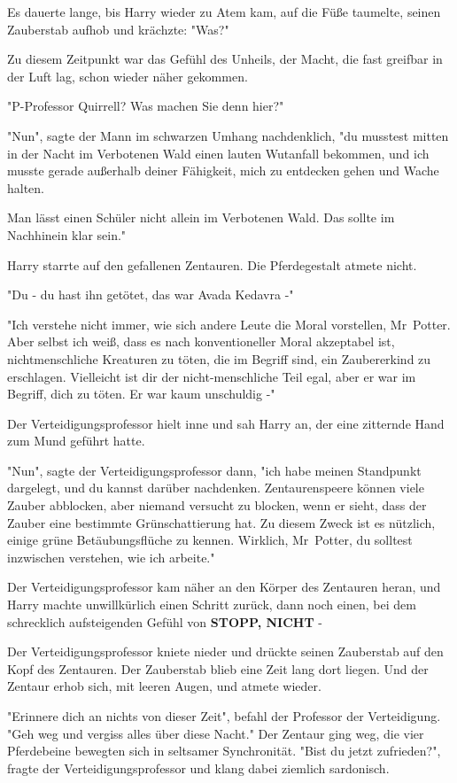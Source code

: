 {Es dauerte lange, bis Harry wieder zu Atem kam, auf die Füße taumelte, seinen Zauberstab aufhob und krächzte: "Was?"

Zu diesem Zeitpunkt war das Gefühl des Unheils, der Macht, die fast greifbar in der Luft lag, schon wieder näher gekommen.

"P-Professor Quirrell? Was machen Sie denn hier?"

"Nun", sagte der Mann im schwarzen Umhang nachdenklich, "du musstest mitten in der Nacht im Verbotenen Wald einen lauten Wutanfall bekommen, und ich musste gerade außerhalb deiner Fähigkeit, mich zu entdecken gehen und Wache halten.

Man lässt einen Schüler nicht allein im Verbotenen Wald. Das sollte im Nachhinein klar sein."

Harry starrte auf den gefallenen Zentauren. Die Pferdegestalt atmete nicht.

"Du - du hast ihn getötet, das war Avada Kedavra -"

"Ich verstehe nicht immer, wie sich andere Leute die Moral vorstellen, Mr~Potter. Aber selbst ich weiß, dass es nach konventioneller Moral akzeptabel ist, nichtmenschliche Kreaturen zu töten, die im Begriff sind, ein Zaubererkind zu erschlagen. Vielleicht ist dir der nicht-menschliche Teil egal, aber er war im Begriff, dich zu töten. Er war kaum unschuldig -"

Der Verteidigungsprofessor hielt inne und sah Harry an, der eine zitternde Hand zum Mund geführt hatte.

"Nun", sagte der Verteidigungsprofessor dann, "ich habe meinen Standpunkt dargelegt, und du kannst darüber nachdenken. Zentaurenspeere können viele Zauber abblocken, aber niemand versucht zu blocken, wenn er sieht, dass der Zauber eine bestimmte Grünschattierung hat. Zu diesem Zweck ist es nützlich, einige grüne Betäubungsflüche zu kennen. Wirklich, Mr~Potter, du solltest inzwischen verstehen, wie ich arbeite."

Der Verteidigungsprofessor kam näher an den Körper des Zentauren heran, und Harry machte unwillkürlich einen Schritt zurück, dann noch einen, bei dem schrecklich aufsteigenden Gefühl von \textbf{STOPP, NICHT} -

Der Verteidigungsprofessor kniete nieder und drückte seinen Zauberstab auf den Kopf des Zentauren. Der Zauberstab blieb eine Zeit lang dort liegen. Und der Zentaur erhob sich, mit leeren Augen, und atmete wieder.

"Erinnere dich an nichts von dieser Zeit", befahl der Professor der Verteidigung. "Geh weg und vergiss alles über diese Nacht." Der Zentaur ging weg, die vier Pferdebeine bewegten sich in seltsamer Synchronität. "Bist du jetzt zufrieden?", fragte der Verteidigungsprofessor und klang dabei ziemlich sardonisch.

}
